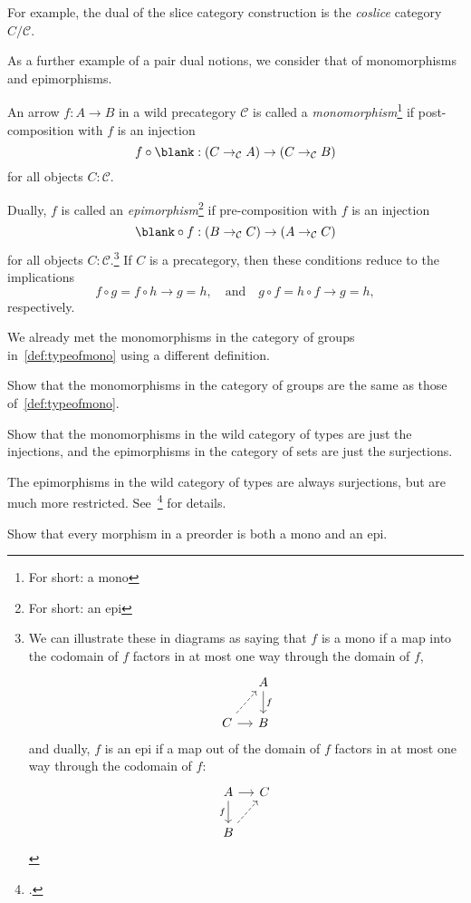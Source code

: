 For example, the dual of the slice category construction
is the \emph{coslice} category $C/\mathcal C$.

As a further example of a pair dual notions, we consider that of
monomorphisms and epimorphisms.
\begin{definition}
  An arrow $f : A \to B$ in a wild precategory $\mathcal C$
  is called a \emph{monomorphism}\footnote{For short: a mono} if
  post-composition with $f$ is an injection
  \[
    f\circ\blank : (C \to_{\mathcal C} A) \to (C \to_{\mathcal C} B)
  \]
  for all objects $C:\mathcal C$.

  Dually, $f$ is called an \emph{epimorphism}\footnote{For short: an epi}
  if pre-composition with $f$ is an injection
  \[
    \blank\circ f : (B \to_{\mathcal C} C) \to (A \to_{\mathcal C} C)
  \]
  for all objects $C:\mathcal C$.\footnote{%
    We can illustrate these in diagrams as saying that
    $f$ is a mono if a map into the codomain of $f$ factors in
    at most one way through the domain of $f$,
    \[
      \begin{tikzcd}[ampersand replacement=\&,column sep=small]
        \& A \ar[d,"f"] \\
        C \ar[ur,dashed]\ar[r] \& B
      \end{tikzcd}
    \]
    and dually, $f$ is an epi if a map out of the domain of $f$
    factors in at most one way through the codomain of $f$:
    \[
      \begin{tikzcd}[ampersand replacement=\&,column sep=small]
        A \ar[d,"f"']\ar[r] \& C \\
        B \ar[ur,dashed]
      \end{tikzcd}
    \]}
  If $C$ is a precategory, then these conditions reduce to the implications
  \[
    f\circ g=f\circ h \to g=h, \quad\text{and}\quad g\circ f=h\circ f \to g=h,
  \]
  respectively.
\end{definition}
We already met the monomorphisms in the category of groups in~\cref{def:typeofmono}
using a different definition.
\begin{xca}
  Show that the monomorphisms in the category of groups are the same as
  those of~\cref{def:typeofmono}.
\end{xca}
\begin{xca}
  Show that the monomorphisms in the wild category of types are just the injections,
  and the epimorphisms in the category of sets are just the surjections.
\end{xca}
The epimorphisms in the wild category of types are always surjections,
but are much more restricted. See~\citeauthor{BdJR2025}\footcite{BdJR2025} for details.
\begin{xca}
  Show that every morphism in a preorder is both a mono and an epi.
\end{xca}

